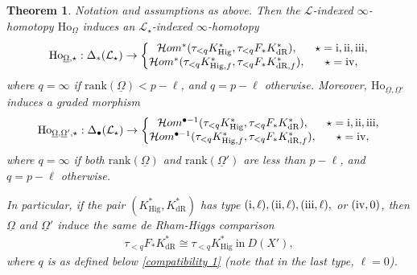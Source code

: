 \documentclass[12pt, a4paper]{article}
\newtheorem{theorem}{Theorem}[section]
\begin{document}
\begin{theorem}\label{compatibility MHM}
Notation and assumptions as above. 
 Then the $\mathcal L$-indexed $\infty$-homotopy 
 $\mathrm{Ho}_{\underline\Omega}$ induces an $\mathcal L_\star$-indexed $\infty$-homotopy 
 \begin{eqnarray}\label{compatibility 1}
 \mathrm{Ho}_{\underline\Omega,\star}:\Delta_*(\mathcal L_\star)\to\left\{\begin{matrix}
 \mathcal Hom^*(\tau_{<q}K^*_\mathrm{Hig},\tau_{<q}F_*K^*_\mathrm{dR}),&\star=\mathrm{\uppercase\expandafter{\romannumeral1}}, \mathrm{\uppercase\expandafter{\romannumeral2}}, 
 \mathrm{\uppercase\expandafter{\romannumeral3}},\\
 \mathcal Hom^*(\tau_{<q}K^*_{\mathrm{Hig},f},\tau_{<q}F_*K^*_{\mathrm{dR},f}),&\star=\mathrm{\uppercase\expandafter{\romannumeral4}},
 \end{matrix}
 \right.
 \end{eqnarray}
where $q = \infty$ if $\mathrm{rank}(\underline\Omega) < p - \ell$, and $q = p - \ell$ otherwise. Moreover, $\mathrm{Ho}_{\underline\Omega,\underline\Omega'}$ induces a graded morphism  
\begin{eqnarray}\label{compatibility 2}
\mathrm{Ho}_{\underline\Omega,\underline\Omega',\star}:\Delta_\bullet(\mathcal L_\star)\to\left\{\begin{matrix}
 \mathcal Hom^{\bullet-1}(\tau_{<q}K^*_\mathrm{Hig},\tau_{<q}F_*K^*_\mathrm{dR}),&\star=\mathrm{\uppercase\expandafter{\romannumeral1}}, \mathrm{\uppercase\expandafter{\romannumeral2}}, 
 \mathrm{\uppercase\expandafter{\romannumeral3}},\\
 \mathcal Hom^{\bullet-1}(\tau_{<q}K^*_{\mathrm{Hig},f},\tau_{<q}F_*K^*_{\mathrm{dR},f}),&\star=\mathrm{\uppercase\expandafter{\romannumeral4}},
 \end{matrix}
 \right.
    \end{eqnarray}
    where $q = \infty$ if both $\mathrm{rank}(\underline{\Omega})$ and $\mathrm{rank}(\underline{\Omega}')$ are less than $p - \ell$, and $q = p - \ell$ otherwise. 

In particular, if the pair $(K^*_\mathrm{Hig},K^*_\mathrm{dR})$ has 
type $(\mathrm{\uppercase\expandafter{\romannumeral1}},\ell), (\mathrm{\uppercase\expandafter{\romannumeral2}},\ell),(\mathrm{\uppercase\expandafter{\romannumeral3}},\ell),$
or
$(\mathrm{\uppercase\expandafter{\romannumeral4}},0)$, then
$\underline\Omega$ and $\underline\Omega'$ induce the same de Rham-Higgs comparison
\begin{eqnarray}\label{de Rham-Higgs 4.3}
\tau_{<q}F_*K^*_\mathrm{dR}\cong\tau_{<q}K^*_\mathrm{Hig}~\mathrm{in}~D(X'),
\end{eqnarray}
where $q$ is as defined below \eqref{compatibility 1} (note that in the last type, $\ell=0$).
\end{theorem}
\end{document}
